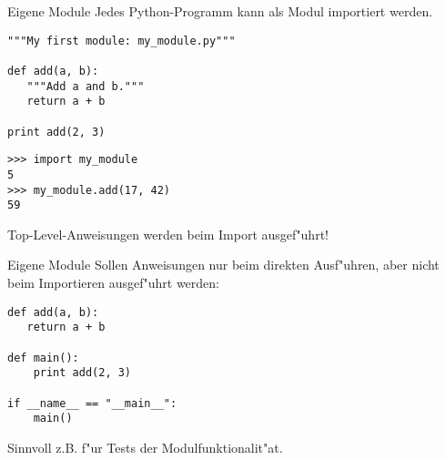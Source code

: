 \begin{frame}[fragile]{Eigene Module}
Jedes Python-Programm kann als Modul importiert werden.
\begin{lstlisting}[style=Python]
"""My first module: my_module.py"""

def add(a, b):
   """Add a and b."""
   return a + b

print add(2, 3)
\end{lstlisting}
\begin{lstlisting}[style=Shell]
>>> import my_module
5
>>> my_module.add(17, 42)
59
\end{lstlisting}
Top-Level-Anweisungen werden beim Import ausgef"uhrt!
\end{frame}

\begin{frame}[fragile]{Eigene Module}
Sollen Anweisungen nur beim direkten Ausf"uhren, aber nicht beim Importieren ausgef"uhrt werden:
\vspace{3mm}
\begin{lstlisting}[style=Python]
def add(a, b):
   return a + b

def main():
    print add(2, 3)

if __name__ == "__main__":
    main()
\end{lstlisting}
Sinnvoll z.B. f"ur Tests der Modulfunktionalit"at.
\end{frame}

